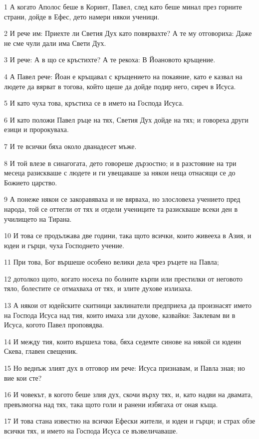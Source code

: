 \par 1 А когато Аполос беше в Коринт, Павел, след като беше минал през горните страни, дойде в Ефес, дето намери някои ученици.
\par 2 И рече им: Приехте ли Светия Дух като повярвахте? А те му отговориха: Даже не сме чули дали има Свети Дух.
\par 3 И рече: А в що се кръстихте? А те рекоха: В Йоановото кръщение.
\par 4 А Павел рече: Йоан е кръщавал с кръщението на покаяние, като е казвал на людете да вярват в тогова, който щеше да дойде подир него, сиреч в Исуса.
\par 5 И като чуха това, кръстиха се в името на Господа Исуса.
\par 6 И като положи Павел ръце на тях, Светия Дух дойде на тях; и говореха други езици и пророкуваха.
\par 7 И те всички бяха около дванадесет мъже.
\par 8 И той влезе в синагогата, дето говореше дързостно; и в разстояние на три месеца разискваше с людете и ги увещаваше за някои неща отнасящи се до Божието царство.
\par 9 А понеже някои се закоравяваха и не вярваха, но злословеха учението пред народа, той се оттегли от тях и отдели учениците та разискваше всеки ден в училището на Тирана.
\par 10 И това се продължава две години, така щото всички, които живееха в Азия, и юдеи и гърци, чуха Господнето учение.
\par 11 При това, Бог вършеше особено велики дела чрез ръцете на Павла;
\par 12 дотолкоз щото, когато носеха по болните кърпи или престилки от неговото тяло, болестите се отмахваха от тях, и злите духове излизаха.
\par 13 А някои от юдейските скитници заклинатели предприеха да произнасят името на Господа Исуса над тия, които имаха зли духове, казвайки: Заклевам ви в Исуса, когото Павел проповядва.
\par 14 И между тия, които вършеха това, бяха седемте синове на някой си юдеин Скева, главен свещеник.
\par 15 Но веднъж злият дух в отговор им рече: Исуса признавам, и Павла зная; но вие кои сте?
\par 16 И човекът, в когото беше злия дух, скочи върху тях, и, като надви на двамата, превъзмогна над тях, така щото голи и ранени избягаха от оная къща.
\par 17 И това стана известно на всички Ефески жители, и юдеи и гърци; и страх обзе всички тях, и името на Господа Исуса се възвеличаваше.
